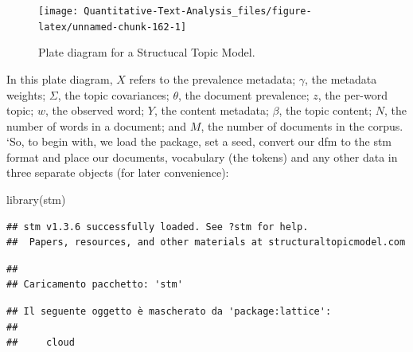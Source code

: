 \documentclass[
]{book}
\newenvironment{Shaded}{\begin{snugshade}}{\end{snugshade}}
\newcommand{\AttributeTok}[1]{\textcolor[rgb]{0.77,0.63,0.00}{#1}}
\newcommand{\DecValTok}[1]{\textcolor[rgb]{0.00,0.00,0.81}{#1}}
\newcommand{\FunctionTok}[1]{\textcolor[rgb]{0.00,0.00,0.00}{#1}}
\newcommand{\NormalTok}[1]{#1}
\newcommand{\OtherTok}[1]{\textcolor[rgb]{0.56,0.35,0.01}{#1}}
\newcommand{\SpecialCharTok}[1]{\textcolor[rgb]{0.00,0.00,0.00}{#1}}
\newcommand{\StringTok}[1]{\textcolor[rgb]{0.31,0.60,0.02}{#1}}
\begin{document}
\begin{figure}
\texttt{[image: Quantitative-Text-Analysis\_files/figure-latex/unnamed-chunk-162-1]} \caption{Plate diagram for a Structucal Topic Model.}\label{fig:unnamed-chunk-162}
\end{figure}

In this plate diagram, \(X\) refers to the prevalence metadata; \(\gamma\), the metadata weights; \(\Sigma\), the topic covariances; \(\theta\), the document prevalence; \(z\), the per-word topic; \(w\), the observed word; \(Y\), the content metadata; \(\beta\), the topic content; \(N\), the number of words in a document; and \(M\), the number of documents in the corpus. `So, to begin with, we load the package, set a seed, convert our dfm to the stm format and place our documents, vocabulary (the tokens) and any other data in three separate objects (for later convenience):

\begin{Shaded}
\begin{Highlighting}[]
\FunctionTok{library}\NormalTok{(stm)}
\end{Highlighting}
\end{Shaded}

\begin{verbatim}
## stm v1.3.6 successfully loaded. See ?stm for help. 
##  Papers, resources, and other materials at structuraltopicmodel.com
\end{verbatim}

\begin{verbatim}
## 
## Caricamento pacchetto: 'stm'
\end{verbatim}

\begin{verbatim}
## Il seguente oggetto è mascherato da 'package:lattice':
## 
##     cloud
\end{verbatim}

\begin{Shaded}
\end{Shaded}
\end{document}
